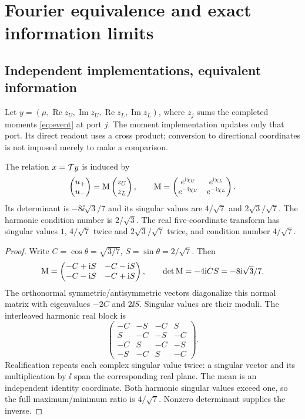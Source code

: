 \section{Fourier equivalence and exact information limits}\label{sec:equivalence}
\subsection{Independent implementations, equivalent information}
Let $y=(\mu,\operatorname{Re}z_U,\operatorname{Im}z_U,\operatorname{Re}z_L,\operatorname{Im}z_L)$, where $z_j$ sums the completed moments \eqref{eq:event} at port $j$. The moment implementation updates only that port. Its direct readout uses a cross product; conversion to directional coordinates is not imposed merely to make a comparison.

\begin{theorem}\label{thm:transform}
The relation $x=\mathcal T y$ is induced by
\begin{equation}\label{eq:M}
 \begin{pmatrix}u_+\\u_-\end{pmatrix}
 =\mathrm M\begin{pmatrix}z_U\\z_L\end{pmatrix},\qquad
 \mathrm M=\begin{pmatrix}e^{\mathrm i\chi_U}&e^{\mathrm i\chi_L}\\
                         e^{-\mathrm i\chi_U}&e^{-\mathrm i\chi_L}\end{pmatrix}.
\end{equation}
Its determinant is $-8\ii\sqrt3/7$ and its singular values are $4/\sqrt7$ and $2\sqrt3/\sqrt7$. The harmonic condition number is $2/\sqrt3$. The real five-coordinate transform has singular values $1$, $4/\sqrt7$ twice and $2\sqrt3/\sqrt7$ twice, and condition number $4/\sqrt7$.
\end{theorem}
\begin{proof}
Write $C=\cos\theta=\sqrt{3/7}$, $S=\sin\theta=2/\sqrt7$. Then
\[
 \mathrm M=\begin{pmatrix}-C+\mathrm i S&-C-\mathrm i S\\-C-\mathrm i S&-C+\mathrm i S\end{pmatrix},
 \qquad\det\mathrm M=-4\mathrm i CS=-8\mathrm i\sqrt3/7 .
\]
The orthonormal symmetric/antisymmetric vectors diagonalize this normal matrix with eigenvalues $-2C$ and $2\ii S$. Singular values are their moduli. The interleaved harmonic real block is
\[
 \begin{pmatrix}
 -C&-S&-C&S\\ S&-C&-S&-C\\
 -C&S&-C&-S\\-S&-C&S&-C
 \end{pmatrix}.
\]
Realification repeats each complex singular value twice: a singular vector and its multiplication by $\ii$ span the corresponding real plane. The mean is an independent identity coordinate. Both harmonic singular values exceed one, so the full maximum/minimum ratio is $4/\sqrt7$. Nonzero determinant supplies the inverse.
\end{proof}

